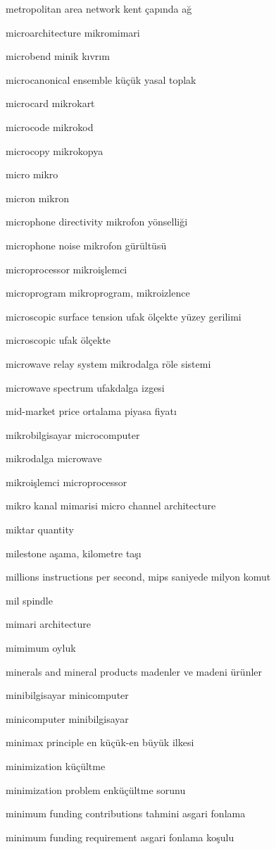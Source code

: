 \documentclass[12pt,fleqn]{article}\usepackage{../../common}
\begin{document}
metropolitan area network kent çapında ağ

microarchitecture mikromimari

microbend minik kıvrım

microcanonical ensemble küçük yasal toplak

microcard mikrokart

microcode mikrokod

microcopy mikrokopya

micro mikro

micron mikron

microphone directivity mikrofon yönselliği

microphone noise mikrofon gürültüsü

microprocessor mikroişlemci

microprogram mikroprogram, mikroizlence

microscopic surface tension ufak ölçekte yüzey gerilimi

microscopic ufak ölçekte

microwave relay system mikrodalga röle sistemi

microwave spectrum ufakdalga izgesi

mid-market price ortalama piyasa fiyatı

mikrobilgisayar microcomputer

mikrodalga microwave

mikroişlemci microprocessor

mikro kanal mimarisi micro channel architecture

miktar quantity

milestone aşama, kilometre taşı

millions instructions per second, mips saniyede milyon komut

mil spindle

mimari architecture

mimimum oyluk

minerals and mineral products madenler ve madeni ürünler

minibilgisayar minicomputer

minicomputer minibilgisayar

minimax principle en küçük-en büyük ilkesi

minimization küçültme

minimization problem enküçültme sorunu

minimum funding contributions tahmini asgari fonlama

minimum funding requirement asgari fonlama koşulu
\end{document}
